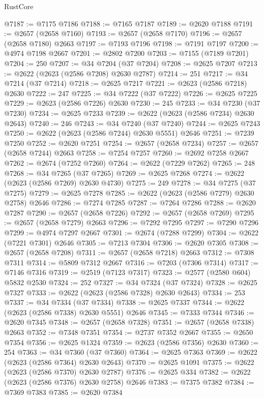 \begin{lexlean}{RustCore}
\begin{coremodule}
@7187 := @7175 @7186
@7188 := @7165 @7187
@7189 := @2620 @7188
@7191 := @2657 (@2658 @7160)
@7193 := @2657 (@2658 @7170)
@7196 := @2657 (@2658 @7180) @2663
@7197 := @7193 @7196
@7198 := @7191 @7197
@7200 := @4974 @7198 @2667
@7201 := @2802 @7200
@7203 := @7155 (@7189 @7201)
@7204 := 250
@7207 := @34 @7204 (@37 @7204)
@7208 := @2625 @7207
@7213 := @2622 (@2623 (@2586 @7208) @2630 @2787)
@7214 := 251
@7217 := @34 @7214 (@37 @7214)
@7218 := @2625 @7217
@7221 := @2623 (@2586 @7218) @2630
@7222 := 247
@7225 := @34 @7222 (@37 @7222)
@7226 := @2625 @7225
@7229 := @2623 (@2586 @7226) @2630
@7230 := 245
@7233 := @34 @7230 (@37 @7230)
@7234 := @2625 @7233
@7239 := @2622 (@2623 (@2586 @7234) @2630 @2643)
@7240 := 246
@7243 := @34 @7240 (@37 @7240)
@7244 := @2625 @7243
@7250 := @2622 (@2623 (@2586 @7244) @2630 @5551) @2646
@7251 := @7239 @7250
@7252 := @2620 @7251
@7254 := @2657 (@2658 @7234)
@7257 := @2657 (@2658 @7244) @2663
@7258 := @7254 @7257
@7260 := @2692 @7258 @2667
@7262 := @2674 (@7252 @7260)
@7264 := @2622 (@7229 @7262)
@7265 := 248
@7268 := @34 @7265 (@37 @7265)
@7269 := @2625 @7268
@7274 := @2622 (@2623 (@2586 @7269) @2630 @4730)
@7275 := 249
@7278 := @34 @7275 (@37 @7275)
@7279 := @2625 @7278
@7285 := @2622 (@2623 (@2586 @7279) @2630 @2758) @2646
@7286 := @7274 @7285
@7287 := @7264 @7286
@7288 := @2620 @7287
@7290 := @2657 (@2658 @7226)
@7292 := @2657 (@2658 @7269)
@7295 := @2657 (@2658 @7279) @2663
@7296 := @7292 @7295
@7297 := @7290 @7296
@7299 := @4974 @7297 @2667
@7301 := @2674 (@7288 @7299)
@7304 := @2622 (@7221 @7301) @2646
@7305 := @7213 @7304
@7306 := @2620 @7305
@7308 := @2657 (@2658 @7208)
@7311 := @2657 (@2658 @7218) @2663
@7312 := @7308 @7311
@7314 := @5809 @7312 @2667
@7316 := @7203 (@7306 @7314)
@7317 := @7146 @7316
@7319 := @2519 (@7123 @7317)
@7323 := @2577 (@2580 @604) @5832 @2530
@7324 := 252
@7327 := @34 @7324 (@37 @7324)
@7328 := @2625 @7327
@7333 := @2622 (@2623 (@2586 @7328) @2630 @2643)
@7334 := 253
@7337 := @34 @7334 (@37 @7334)
@7338 := @2625 @7337
@7344 := @2622 (@2623 (@2586 @7338) @2630 @5551) @2646
@7345 := @7333 @7344
@7346 := @2620 @7345
@7348 := @2657 (@2658 @7328)
@7351 := @2657 (@2658 @7338) @2663
@7352 := @7348 @7351
@7354 := @2737 @7352 @2667
@7355 := @2650 @7354
@7356 := @2625 @1324
@7359 := @2623 (@2586 @7356) @2630
@7360 := 254
@7363 := @34 @7360 (@37 @7360)
@7364 := @2625 @7363
@7369 := @2622 (@2623 (@2586 @7364) @2630 @2643)
@7370 := @2625 @1091
@7375 := @2622 (@2623 (@2586 @7370) @2630 @2787)
@7376 := @2625 @334
@7382 := @2622 (@2623 (@2586 @7376) @2630 @2758) @2646
@7383 := @7375 @7382
@7384 := @7369 @7383
@7385 := @2620 @7384

\end{coremodule}
\end{lexlean}
